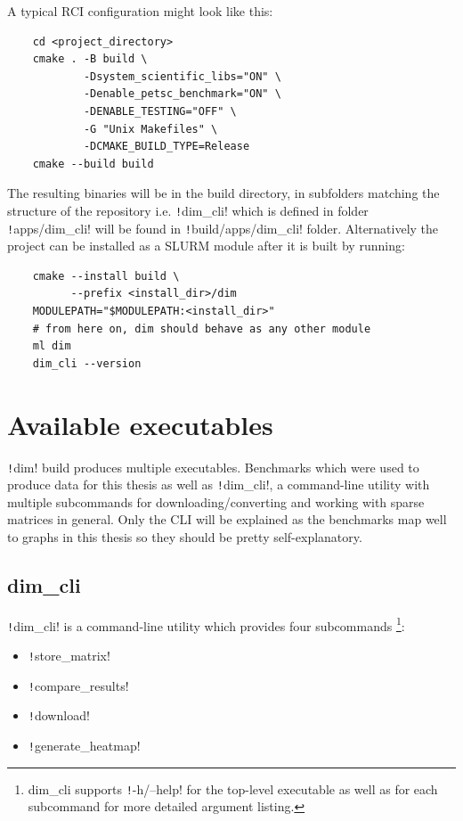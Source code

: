 \documentclass[thesis=M,english]{FITthesis}[2019/12/23]
\newcommand{\csre}[1]{\texttt!#1!}
\begin{document}
A typical RCI configuration might look like this:
\begin{verbatim}
    cd <project_directory>
    cmake . -B build \
            -Dsystem_scientific_libs="ON" \
            -Denable_petsc_benchmark="ON" \
            -DENABLE_TESTING="OFF" \
            -G "Unix Makefiles" \
            -DCMAKE_BUILD_TYPE=Release
    cmake --build build
\end{verbatim}

The resulting binaries will be in the build directory, in subfolders matching the structure of
the repository i.e. \csre{dim_cli} which is defined in folder \csre{apps/dim_cli} will be found
in \csre{build/apps/dim_cli} folder. Alternatively the project can be installed as a SLURM module
after it is built by running:

\begin{verbatim}
    cmake --install build \
          --prefix <install_dir>/dim
    MODULEPATH="$MODULEPATH:<install_dir>"
    # from here on, dim should behave as any other module
    ml dim
    dim_cli --version
\end{verbatim}

\section{Available executables}

\csre{dim} build produces multiple executables. Benchmarks which were used to produce data for this thesis as
well as \csre{dim_cli}, a command-line utility with multiple subcommands for downloading/converting and
working with sparse matrices in general. Only the CLI will be explained as the benchmarks map well to
graphs in this thesis so they should be pretty self-explanatory.

\subsection{dim\_cli}

\csre{dim_cli} is a command-line utility which provides four subcommands
\footnote{dim\_cli supports \csre{-h/--help} for the top-level executable as well as for each subcommand for more detailed argument listing.}:
\begin{itemize}
    \item \csre{store_matrix}
    \item \csre{compare_results}
    \item \csre{download}
    \item \csre{generate_heatmap}
\end{itemize}
\end{document}
